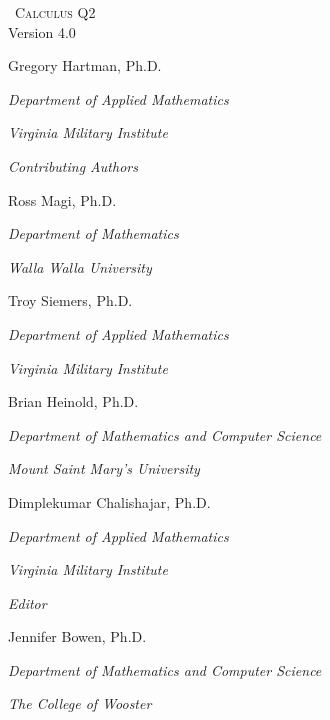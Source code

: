 
\hskip 125pt\begin{minipage}{\textwidth}
\begin{flushright}
\thispagestyle{empty}


\textsc{\large \apex\ {\Huge Calculus Q2}} \\

{\small Version 4.0}\\

\Large
\vspace{1in}

Gregory Hartman, Ph.D.

\emph{\small Department of Applied Mathematics}

\emph{\small Virginia Military Institute}\vskip15pt

\parbox{200pt}{\textit{Contributing Authors}}\hskip 2cm \phantom{.}

Ross Magi, Ph.D.

\emph{\small Department of Mathematics}

\emph{\small Walla Walla University}\vskip 15pt

Troy Siemers, Ph.D. %


\emph{\small Department of Applied Mathematics}

\emph{\small Virginia Military Institute}\vskip 15pt

Brian Heinold, Ph.D.

\emph{\small Department of Mathematics and Computer Science}

\emph{\small Mount Saint Mary's University}\vskip 15pt

Dimplekumar Chalishajar, Ph.D.

\emph{\small Department of Applied Mathematics}

\emph{\small Virginia Military Institute}\vskip 25pt

\parbox{200pt}{\textit{Editor}}\hskip 2cm \phantom{.}

Jennifer Bowen, Ph.D.

\emph{\small Department of Mathematics and Computer Science}

\emph{\small The College of Wooster}

\normalsize
\end{flushright}
\end{minipage}

